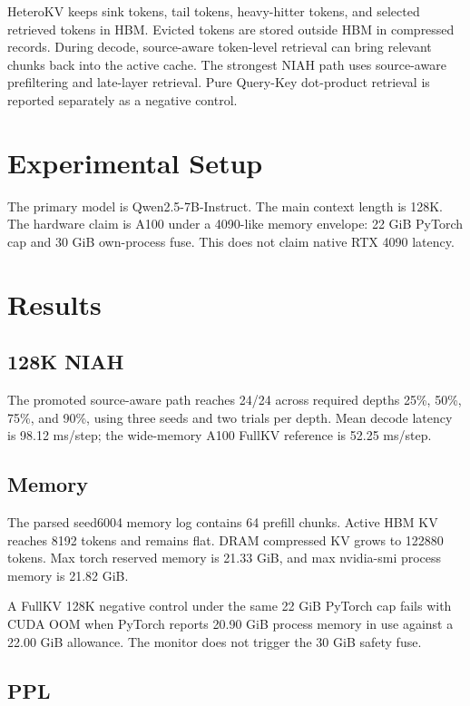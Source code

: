 \documentclass[10pt]{article}
\begin{document}
HeteroKV keeps sink tokens, tail tokens, heavy-hitter tokens, and selected
retrieved tokens in HBM. Evicted tokens are stored outside HBM in compressed
records. During decode, source-aware token-level retrieval can bring relevant
chunks back into the active cache. The strongest NIAH path uses source-aware
prefiltering and late-layer retrieval. Pure Query-Key dot-product retrieval is
reported separately as a negative control.

\section{Experimental Setup}

The primary model is Qwen2.5-7B-Instruct. The main context length is 128K. The
hardware claim is A100 under a 4090-like memory envelope: 22 GiB PyTorch cap
and 30 GiB own-process fuse. This does not claim native RTX 4090 latency.

\section{Results}

\subsection{128K NIAH}

The promoted source-aware path reaches 24/24 across required depths 25\%,
50\%, 75\%, and 90\%, using three seeds and two trials per depth. Mean decode
latency is 98.12 ms/step; the wide-memory A100 FullKV reference is
52.25 ms/step.

\subsection{Memory}

The parsed seed6004 memory log contains 64 prefill chunks. Active HBM KV reaches
8192 tokens and remains flat. DRAM compressed KV grows to 122880 tokens. Max
torch reserved memory is 21.33 GiB, and max nvidia-smi process memory is
21.82 GiB.

A FullKV 128K negative control under the same 22 GiB PyTorch cap fails with
CUDA OOM when PyTorch reports 20.90 GiB process memory in use against a
22.00 GiB allowance. The monitor does not trigger the 30 GiB safety fuse.

\subsection{PPL}
\end{document}
